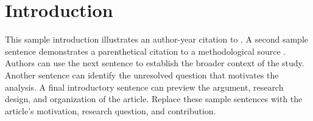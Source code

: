 \section{Introduction}
\label{sec:introduction}

This sample introduction illustrates an author-year citation to \citet{Putnam1988}. A second sample sentence demonstrates a parenthetical citation to a methodological source \citep{Angrist2009}. Authors can use the next sentence to establish the broader context of the study. Another sentence can identify the unresolved question that motivates the analysis. A final introductory sentence can preview the argument, research design, and organization of the article. Replace these sample sentences with the article's motivation, research question, and contribution.

